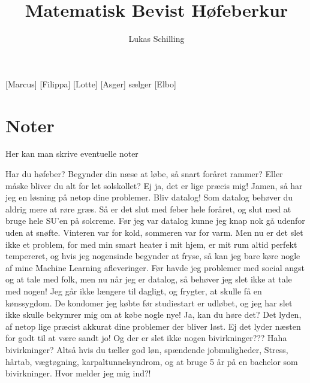 \documentclass[a4paper,11pt]{article}
\title{Matematisk Bevist Høfeberkur}
\author{Lukas Schilling}
\begin{document}
\maketitle
\begin{roles}
[Marcus] 
[Filippa]
[Lotte]
[Asger] sælger
[Elbo]
\end{roles} 

\section*{Noter}
Her kan man skrive eventuelle noter 

\begin{props}
\prop{}
\prop{}
\prop{}
\prop{}
\prop{}
\prop{}
\end{props}



\begin{sketch}
 Har du høfeber? Begynder din næse at løbe, så snart foråret rammer? Eller måske bliver du alt for let solskollet?
 Ej ja, det er lige præcis mig!
Jamen, så har jeg en løsning på netop dine problemer.
Bliv datalog!
Som datalog behøver du aldrig mere at røre græs. Så er det slut med feber hele foråret, og slut med at bruge hele SU’en på solcreme.
Før jeg var datalog kunne jeg knap nok gå udenfor uden at snøfte. Vinteren var for kold, sommeren var for varm. Men nu er det slet ikke et problem, for med min smart heater i mit hjem, er mit rum altid perfekt tempereret, og hvis jeg nogensinde begynder at fryse, så kan jeg bare køre nogle af mine Machine Learning afleveringer.
Før havde jeg problemer med social angst og at tale med folk, men nu når jeg er datalog, så behøver jeg slet ikke at tale med nogen! Jeg går ikke længere til dagligt, og frygter, at skulle få en kønssygdom. De kondomer jeg købte før studiestart er udløbet, og jeg har slet ikke skulle bekymrer mig om at købe nogle nye!
 Ja, kan du høre det? Det lyden, af netop lige præcist akkurat dine problemer der bliver løst.
Ej det lyder næsten for godt til at være sandt jo! Og der er slet ikke nogen bivirkninger???
Haha bivirkninger? Altså hvis du tæller god løn, spændende jobmuligheder, 
Stress, hårtab, vægtøgning, karpaltunnelsyndrom, og at bruge 5 år på en bachelor 
som bivirkninger.
Hvor melder jeg mig ind?!
\end{sketch}
\end{document}
